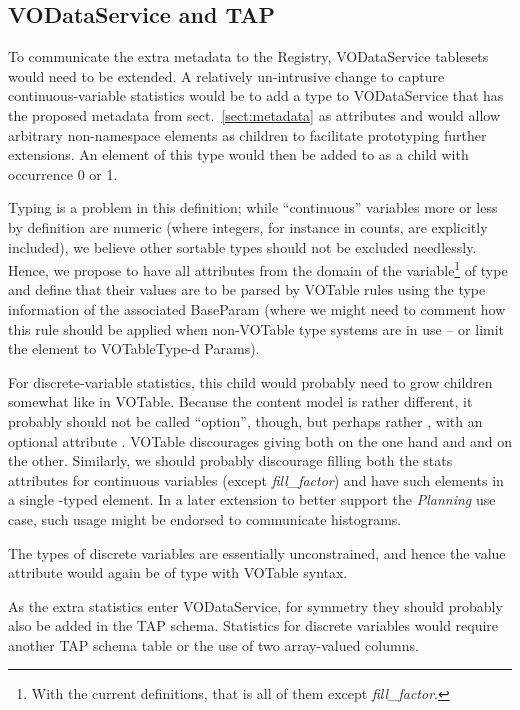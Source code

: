 \documentclass[11pt,a4paper]{ivoa}
\begin{document}
\subsection{VODataService and TAP}

To communicate the extra metadata to the Registry, VODataService
tablesets would need to be extended.  A relatively un-intrusive change
to capture continuous-variable statistics would be to add a type
 to VODataService that has the proposed metadata from
sect.~\ref{sect:metadata} as attributes and would allow arbitrary
non-namespace elements as children to facilitate prototyping further
extensions. An element of this type would then be added to
 as a  child with occurrence 0 or 1.

Typing is a problem in this definition; while ``continuous'' variables
more or less by definition are numeric (where integers, for instance in
counts, are explicitly included), we believe other sortable types should
not be excluded needlessly.  Hence, we propose to have all
attributes from the domain of the variable\footnote{With the current
definitions, that is all of them except \emph{fill\_factor}.} of type
  and define that their values are to be parsed by
VOTable rules using the type information of the associated BaseParam
(where we might need to comment how this rule should be applied when
non-VOTable type systems are in use -- or limit the element to
VOTableType-d Params).

For discrete-variable statistics, this  child would
probably need to grow children somewhat like  in VOTable.
Because the content model is rather different, it probably should not be
called ``option'', though, but perhaps rather , with an
optional attribute .  VOTable discourages giving both
 on the one hand and  and  on the
other.  Similarly, we should probably discourage filling both the
stats attributes for continuous variables 
(except \emph{fill\_factor}) and have such 
elements in a single -typed element.  
In a later extension to better support the \emph{Planning}
use case, such usage might be endorsed to communicate histograms.

The types of discrete variables are essentially unconstrained, and hence
the value attribute would again be of type  with VOTable
syntax.

As the extra statistics enter VODataService, for symmetry they should
probably also be added in the TAP schema.  Statistics for discrete
variables would require another TAP schema table or the use of two
array-valued columns.
\end{document}
